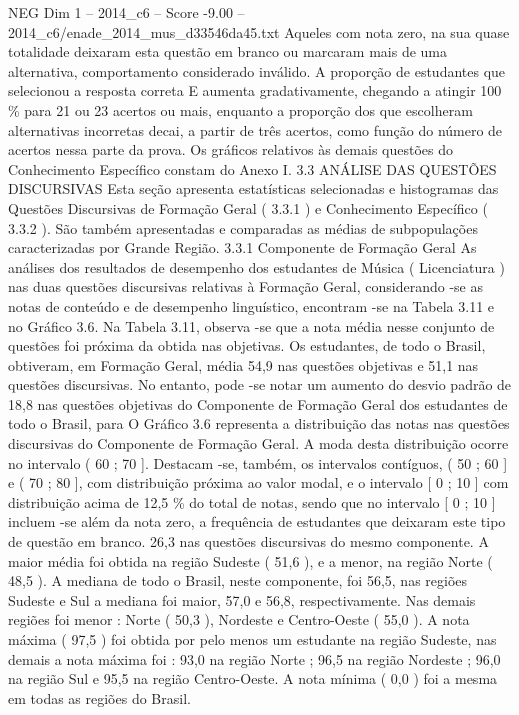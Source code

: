 \begin{textsample}{NEG Dim 1 – 2014\_c6 – Score -9.00 – 2014\_c6/enade\_2014\_mus\_d33546da45.txt}
Aqueles com nota zero, na sua quase totalidade deixaram esta questão em branco ou marcaram mais de uma alternativa, comportamento considerado inválido.
A proporção de estudantes que selecionou a resposta correta E aumenta gradativamente, chegando a atingir 100 \% para 21 ou 23 acertos ou mais, enquanto a proporção dos que escolheram alternativas incorretas decai, a partir de três acertos, como função do número de acertos nessa parte da prova.
Os gráficos relativos às demais questões do Conhecimento Específico constam do Anexo I. 3.3 ANÁLISE DAS QUESTÕES DISCURSIVAS Esta seção apresenta estatísticas selecionadas e histogramas das Questões Discursivas de Formação Geral ( 3.3.1 ) e Conhecimento Específico ( 3.3.2 ).
São também apresentadas e comparadas as médias de subpopulações caracterizadas por Grande Região. 3.3.1 Componente de Formação Geral As análises dos resultados de desempenho dos estudantes de Música ( Licenciatura ) nas duas questões discursivas relativas à Formação Geral, considerando -se as notas de conteúdo e de desempenho linguístico, encontram -se na Tabela 3.11 e no Gráfico 3.6.
Na Tabela 3.11, observa -se que a nota média nesse conjunto de questões foi próxima da obtida nas objetivas.
Os estudantes, de todo o Brasil, obtiveram, em Formação Geral, média 54,9 nas questões objetivas e 51,1 nas questões discursivas.
No entanto, pode -se notar um aumento do desvio padrão de 18,8 nas questões objetivas do Componente de Formação Geral dos estudantes de todo o Brasil, para O Gráfico 3.6 representa a distribuição das notas nas questões discursivas do Componente de Formação Geral.
A moda desta distribuição ocorre no intervalo ( 60 ; 70 ].
Destacam -se, também, os intervalos contíguos, ( 50 ; 60 ] e ( 70 ; 80 ], com distribuição próxima ao valor modal, e o intervalo [ 0 ; 10 ] com distribuição acima de 12,5 \% do total de notas, sendo que no intervalo [ 0 ; 10 ] incluem -se além da nota zero, a frequência de estudantes que deixaram este tipo de questão em branco. 26,3 nas questões discursivas do mesmo componente.
A maior média foi obtida na região Sudeste ( 51,6 ), e a menor, na região Norte ( 48,5 ).
A mediana de todo o Brasil, neste componente, foi 56,5, nas regiões Sudeste e Sul a mediana foi maior, 57,0 e 56,8, respectivamente.
Nas demais regiões foi menor : Norte ( 50,3 ), Nordeste e Centro-Oeste ( 55,0 ).
A nota máxima ( 97,5 ) foi obtida por pelo menos um estudante na região Sudeste, nas demais a nota máxima foi : 93,0 na região Norte ; 96,5 na região Nordeste ; 96,0 na região Sul e 95,5 na região Centro-Oeste.
A nota mínima ( 0,0 ) foi a mesma em todas as regiões do Brasil.

\end{textsample}
